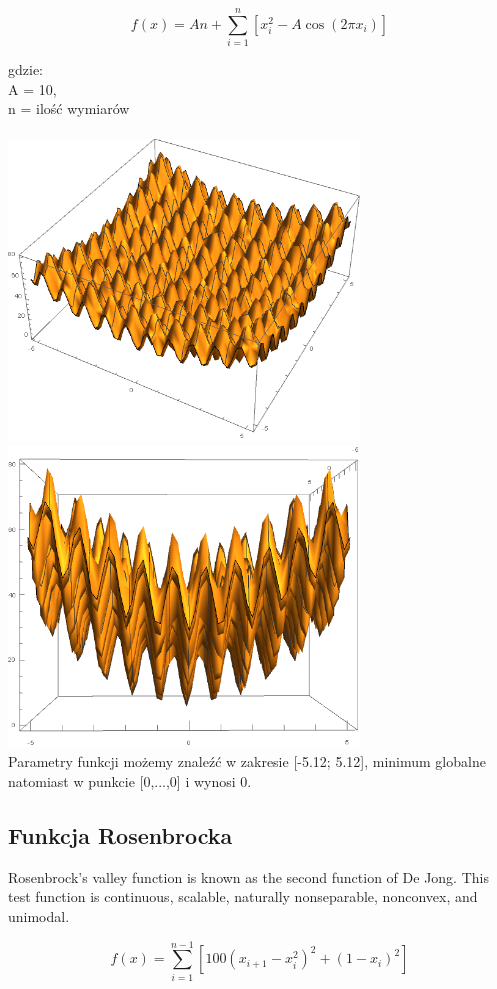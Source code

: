 \documentclass[twoside]{projektInzynierskiMS1}
\newcommand{\newLine}{~\\}
\newcommand{\si}{ś}
\begin{document}
\[f(x) = An + \sum_{i=1}^{n} [x_i^2 - A \cos{(2 \pi x_i)}] \]

gdzie: \\
A = 10, \\
n = ilo\si ć wymiarów \\ \newLine

\includegraphics[height=8cm]{rastriginFunction1.png}\\
\includegraphics[height=8cm]{rastriginFunction2.png}\\


Parametry funkcji możemy znaleźć w zakresie [-5.12; 5.12], minimum globalne natomiast w punkcie [0,...,0] i wynosi 0.
	\subsection{Funkcja Rosenbrocka}
	Rosenbrock's valley function is known as the second function of De Jong. This test function is continuous, scalable, naturally nonseparable, nonconvex, and unimodal.


\[f(x) = \sum_{i=1}^{n-1} [100(x_{i+1} - x_i^2)^2 + (1- x_i)^2 ]\]
\end{document}
